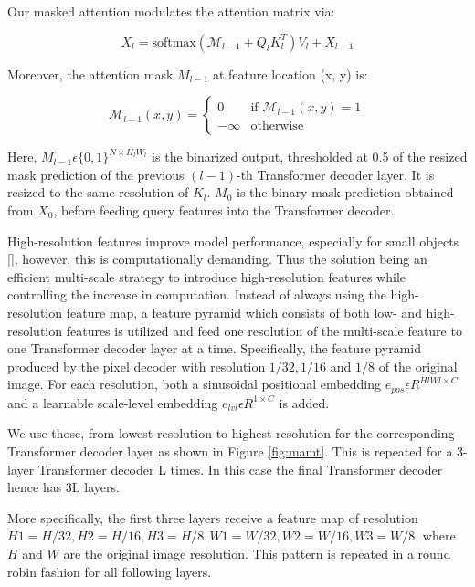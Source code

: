 Our masked attention modulates the attention matrix via:

\begin{equation}
    X_l = \text{softmax}(\mathcal{M}_{l-1} + Q_l K_l^T) V_l + X_{l-1} \tag{7}
\end{equation}


Moreover, the attention mask $M_{l-1}$ at feature location (x, y) is:

\begin{equation}
    \mathcal{M}_{l-1}(x, y) = 
    \begin{cases} 
    0 & \text{if } \mathcal{M}_{l-1}(x, y) = 1 \\
    -\infty & \text{otherwise} 
    \end{cases}  \tag{8}
\end{equation}
    

Here, $M_{l-1} \epsilon \{0, 1\}^{N \times H_l W_l}$  is the binarized output, thresholded at 0.5 of the resized mask prediction of the previous $(l - 1)$-th 
Transformer decoder layer. It is resized to the same resolution of $K_l$. $M_0$ is the binary mask prediction obtained from $X_0$, before feeding query features
into the Transformer decoder.

High-resolution features improve model performance, especially for small objects [], however, this is computationally demanding. 
Thus the solution being an efficient multi-scale strategy to introduce high-resolution features while controlling the increase in computation. 
Instead of always using the high-resolution feature map, a feature pyramid which consists of both low- and high-resolution features is utilized and 
feed one resolution of the  multi-scale feature to one Transformer decoder layer at a time. Specifically, the feature pyramid produced by the 
pixel decoder with resolution $1/32, 1/16$ and $1/8$ of the original image. For each resolution, both a sinusoidal positional embedding 
$e_{pos} \epsilon R^{HlWl×C}$ and a learnable scale-level embedding $e_{lvl} \epsilon R^{1 \times C}$ is added. 

We use those, from lowest-resolution to highest-resolution for the corresponding Transformer decoder layer as shown in Figure \ref{fig:mamt}. This is 
repeated for a 3-layer Transformer decoder L times. In this case the final Transformer decoder hence has 3L layers. 

More specifically, the first three layers receive a feature map of resolution $H1 = H/32, H2 = H/16, H3 = H/8, W1 = W/32, W2 = W/16, W3 = W/8$, 
where $H$ and $W$ are the original image resolution. This pattern is repeated in a round robin fashion for all following layers.

